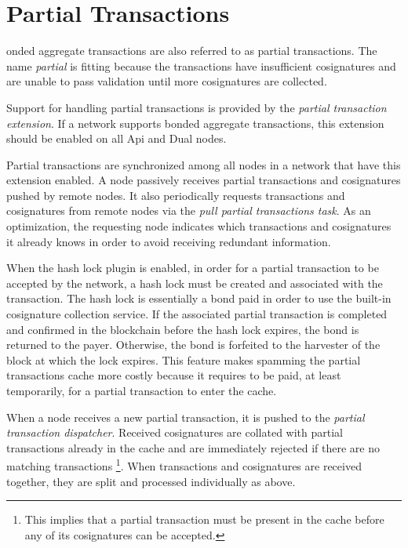 \section{Partial Transactions}
\label{sec:partials}


onded aggregate transactions  are also referred to as partial transactions.
The name \emph{partial} is fitting because the transactions have insufficient cosignatures and are unable to pass validation until more cosignatures are collected.

Support for handling partial transactions is provided by the \textit{partial transaction extension}.
If a network supports bonded aggregate transactions, this extension should be enabled on all Api and Dual nodes.

Partial transactions are synchronized among all nodes in a network that have this extension enabled.
A node passively receives partial transactions and cosignatures pushed by remote nodes.
It also periodically requests transactions and cosignatures from remote nodes via the \textit{pull partial transactions task}.
As an optimization, the requesting node indicates which transactions and cosignatures it already knows in order to avoid receiving redundant information.

When the hash lock plugin is enabled, in order for a partial transaction to be accepted by the network, a hash lock must be created and associated with the transaction.
The hash lock is essentially a bond paid in order to use the built-in cosignature collection service.
If the associated partial transaction is completed and confirmed in the blockchain before the hash lock expires, the bond is returned to the payer.
Otherwise, the bond is forfeited to the harvester of the block at which the lock expires.
This feature makes spamming the partial transactions cache more costly because it requires  to be paid, at least temporarily, for a partial transaction to enter the cache.

When a node receives a new partial transaction, it is pushed to the \textit{partial transaction dispatcher}.
Received cosignatures are collated with partial transactions already in the cache and are immediately rejected if there are no matching transactions
\footnote{This implies that a partial transaction must be present in the cache before any of its cosignatures can be accepted.}.
When transactions and cosignatures are received together, they are split and processed individually as above.

